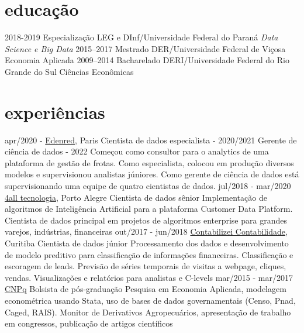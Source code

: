 \documentclass[]{friggeri-cv}
\begin{document}
\section{educação}

\begin{entrylist}
  \entry
    {2018-2019}
    {Especialização}
    {LEG e DInf/Universidade Federal do Paraná}
    {\emph{Data Science e Big Data}}
  \entry
    {2015–2017}
    {Mestrado}
    {DER/Universidade Federal de Viçosa}
    {Economia Aplicada}
  \entry
    {2009–2014}
    {Bacharelado}
    {DERI/Universidade Federal do Rio Grande do Sul}
    {Ciências Econômicas}
\end{entrylist}

\section{experiências}

\begin{entrylist}
  \entry
    {apr/2020 - }
    {\href{https://www.edenred.com}{Edenred}, Paris}
    {\hspace{3cm} Cientista de dados especialista - 2020/2021 Gerente de ciência de dados - 2022}
    {Começou como consultor para o analytics de uma plataforma de gestão de frotas.
    Como especialista, colocou em produção diversos modelos e supervisionou analistas júniores.
    Como gerente de ciência de dados está supervisionando uma equipe de quatro cientistas de dados.}
  \entry
    {jul/2018 - mar/2020}
    {\href{https://4all.com}{4all tecnologia}, Porto Alegre}
    {Cientista de dados sênior}
    {Implementação de algoritmos de Inteligência Artificial para a plataforma Customer Data Platform.
    Cientista de dados principal em projetos de algoritmos enterprise para grandes varejos, indústrias, financeiras}
  \entry
    {out/2017 - jun/2018}
    {\href{https://www.contabilizei.com.br}{Contabilizei Contabilidade}, Curitiba}
    {Cientista de dados júnior}
    {Processamento dos dados e desenvolvimento de modelo preditivo para classificação de informações financeiras.
    Classificação e escoragem de leads.
    Previsão de séries temporais de visitas a webpage, cliques, vendas.
    Visualizações e relatórios para analistas e C-levels}
  \entry
    {mar/2015 - mar/2017}
    {\href{cnpq.br}{CNPq}}
    {Bolsista de pós-graduação}
    {Pesquisa em Economia Aplicada, modelagem econométrica usando Stata, uso de bases de dados governamentais (Censo, Pnad, Caged, RAIS).
    Monitor de Derivativos Agropecuários, apresentação de trabalho em congressos, publicação de artigos científicos}
\end{entrylist}
\end{document}
